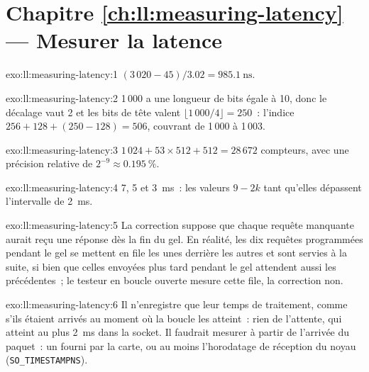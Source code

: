 \section*{Chapitre \ref{ch:ll:measuring-latency} --- Mesurer la latence}

\begin{solution}{exo:ll:measuring-latency:1}
$(3\,020 - 45)/3.02 = \qty{985.1}{\nano\second}$.
\end{solution}

\begin{solution}{exo:ll:measuring-latency:2}
1\,000 a une longueur de bits égale à 10, donc le décalage vaut 2 et les bits de tête valent $\lfloor 1\,000/4 \rfloor = 250$~: l'indice $256 + 128 +
(250-128) = 506$, couvrant de 1\,000 à 1\,003.
\end{solution}

\begin{solution}{exo:ll:measuring-latency:3}
$1\,024 + 53 \times 512 + 512 = 28\,672$ compteurs, avec une précision relative de $2^{-9} \approx 0.195~\%$.
\end{solution}

\begin{solution}{exo:ll:measuring-latency:4}
7, 5 et \qty{3}{\milli\second}~: les valeurs $9 - 2k$ tant qu'elles dépassent l'intervalle de \qty{2}{\milli\second}.
\end{solution}

\begin{solution}{exo:ll:measuring-latency:5}
La correction suppose que chaque requête manquante aurait reçu une réponse dès la fin du gel. En réalité, les dix
requêtes programmées pendant le gel se mettent en file les unes derrière les autres et sont servies à la suite, si bien que celles envoyées plus tard
pendant le gel attendent aussi les précédentes~; le testeur en boucle ouverte mesure cette file, la correction non.
\end{solution}

\begin{solution}{exo:ll:measuring-latency:6}
Il n'enregistre que leur temps de traitement, comme s'ils étaient arrivés au moment où la boucle les atteint~: rien de l'attente, qui atteint au plus
\qty{2}{\milli\second} dans la socket. Il faudrait mesurer à partir de l'arrivée du paquet~: un  fourni par
la carte, ou au moins l'horodatage de réception du noyau (\texttt{SO\_TIMESTAMPNS}).
\end{solution}

